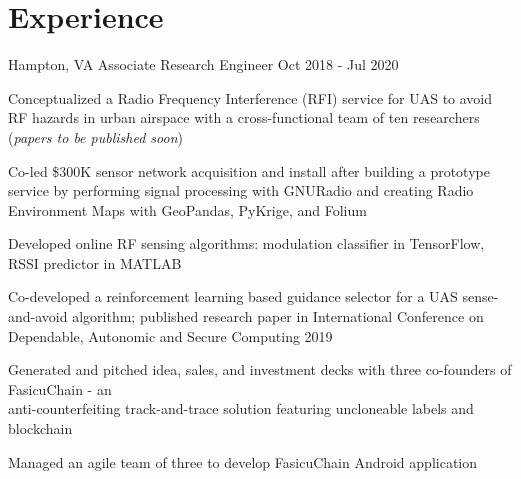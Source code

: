\documentclass[11pt, letterpaper]{simple_resume}[2020/07/29]
\begin{document}
\section{Experience}
                {Hampton, VA} %
                {Associate Research Engineer} %
                {Oct 2018 - Jul 2020} %
{\begin{items}
    \item {Conceptualized a Radio Frequency Interference (RFI) service for UAS to avoid RF hazards in urban airspace with a cross-functional team of ten researchers (\textit{papers to be published soon})}
    \item {Co-led \$300K sensor network  acquisition and install after building a prototype service by performing signal processing with GNURadio and creating Radio Environment Maps with GeoPandas, PyKrige, and Folium}
    \item {Developed online RF sensing algorithms: modulation classifier in TensorFlow, RSSI predictor in MATLAB }
    \item {Co-developed a reinforcement learning based guidance selector for a UAS sense-and-avoid algorithm; published research paper in International Conference on Dependable, Autonomic and Secure Computing 2019}
\end{items}}

\vspace{-1ex}

{\begin{items}
    \item {Generated and pitched idea, sales, and investment decks with three co-founders of FasicuChain - an \\ 
    anti-counterfeiting track-and-trace solution featuring uncloneable labels and blockchain} 
    \item {Managed an agile team of three to develop FasicuChain Android application}
\end{items}
}
\vspace{-1ex}
\end{document}
